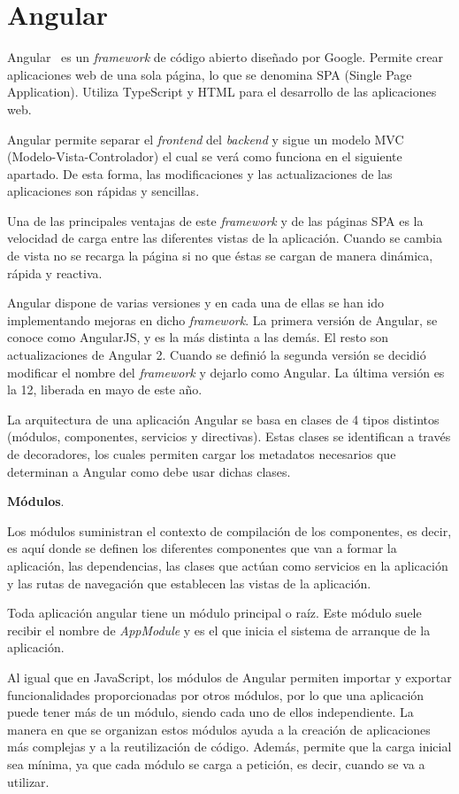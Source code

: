 \documentclass[a4paper, 12pt]{book}
\begin{document}
\section{Angular} 
\label{sec:angular}

Angular~\cite{angular} es un \emph{framework} de código abierto diseñado por Google. Permite crear aplicaciones web de una sola página, lo que se denomina SPA (Single Page Application). Utiliza TypeScript y HTML para el desarrollo de las aplicaciones web. 

Angular permite separar el \emph{frontend} del \emph{backend} y sigue un modelo MVC (Modelo-Vista-Controlador) el cual se verá como funciona en el siguiente apartado. De esta forma, las modificaciones y las actualizaciones de las aplicaciones son rápidas y sencillas. 

Una de las principales ventajas de este \emph{framework} y de las páginas SPA es la velocidad de carga entre las diferentes vistas de la aplicación. Cuando se cambia de vista no se recarga la página si no que éstas se cargan de manera dinámica, rápida y reactiva. 

Angular dispone de varias versiones y en cada una de ellas se han ido implementando mejoras en dicho \emph{framework}. La primera versión de Angular, se conoce como AngularJS, y es la más distinta a las demás. El resto son actualizaciones de Angular 2. Cuando se definió la segunda versión se decidió modificar el nombre del \emph{framework} y dejarlo como Angular. La última versión es la 12, liberada en mayo de este año.

La arquitectura de una aplicación Angular se basa en clases de 4 tipos distintos (módulos, componentes, servicios y directivas). Estas clases se identifican a través de decoradores, los cuales permiten cargar los metadatos necesarios que determinan a Angular como debe usar dichas clases.

\textbf{Módulos}.

Los módulos suministran el contexto de compilación de los componentes, es decir, es aquí donde se definen los diferentes componentes que van a formar la aplicación, las dependencias, las clases que actúan como servicios en la aplicación y las rutas de navegación que establecen las vistas de la aplicación. 

Toda aplicación angular tiene un módulo principal o raíz. Este módulo suele recibir el nombre de \emph{AppModule} y es el que inicia el sistema de arranque de la aplicación.

Al igual que en JavaScript, los módulos de Angular permiten importar y exportar funcionalidades proporcionadas por otros módulos, por lo que una aplicación puede tener más de un módulo, siendo cada uno de ellos independiente. La manera en que se organizan estos módulos ayuda a la creación de aplicaciones más complejas y a la reutilización de código. Además, permite que la carga inicial sea mínima, ya que cada módulo se carga a petición, es decir, cuando se va a utilizar. 
\end{document}
